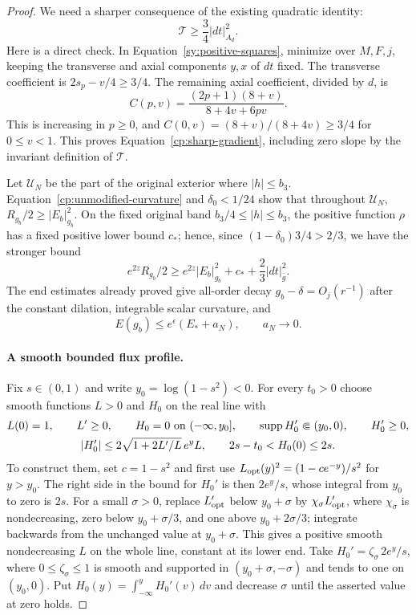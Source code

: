 \begin{proof}
We need a sharper consequence of the existing quadratic identity:
\begin{equation}\label{cp:sharp-gradient}
 \mathcal T\ge\frac34|dt|_{A_d}^2.
\end{equation}
Here is a direct check.  In Equation~\eqref{sy:positive-squares},
minimize over $M,F,j$, keeping the transverse and axial components
$y,x$ of $dt$ fixed.  The transverse coefficient is
$2s_p-v/4\ge3/4$.  The remaining axial coefficient, divided by $d$, is
\[
 C(p,v)=\frac{(2p+1)(8+v)}{8+4v+6pv}.
\]
This is increasing in $p\ge0$, and
$C(0,v)=(8+v)/(8+4v)\ge3/4$ for $0\le v<1$.
This proves Equation~\eqref{cp:sharp-gradient}, including zero slope
by the invariant definition of $\mathcal T$.

Let $\mathcal U_N$ be the part of the original exterior where
$|h|\le b_3$.  Equation~\eqref{cp:unmodified-curvature} and
$\delta_0<1/24$ show that throughout $\mathcal U_N$,
$R_{g_b}/2\ge|E_b|_{g_b}^2$.  On the fixed original band
$b_3/4\le|h|\le b_3$, the positive function $\rho$ has a fixed
positive lower bound $c_*$; hence, since
$(1-\delta_0)3/4>2/3$, we have the stronger bound
\begin{equation}\label{cp:retained-band}
 e^{2z}R_{g_b}/2\ge e^{2z}|E_b|_{g_b}^2+c_*
                       +\frac23|dt|_{\bar g}^2.
\end{equation}
The end estimates already proved give all-order decay
$g_b-\delta=O_j(r^{-1})$ after the constant dilation, integrable
scalar curvature, and
\[
 E(g_b)\le e^\epsilon(E_*+a_N),\qquad a_N\longrightarrow0.
\]

\paragraph{A smooth bounded flux profile.}
Fix $s\in(0,1)$ and write $y_0=\log(1-s^2)<0$.  For every
$t_0>0$ choose smooth functions $L>0$ and $H_0$ on the real line with
\begin{gather*}
 L(0)=1,\qquad L'\ge0,\qquad
 H_0=0\ \hbox{on }(-\infty,y_0],\qquad
 \operatorname{supp}H_0'\Subset(y_0,0),\qquad H_0'\ge0,\\
 |H_0'|\le2\sqrt{1+2L'/L}\,e^yL,
 \qquad 2s-t_0<H_0(0)\le2s.
\end{gather*}
To construct them, set $c=1-s^2$ and first use
$L_{\rm opt}(y)^2=(1-ce^{-y})/s^2$ for $y>y_0$.
The right side in the bound for $H_0'$ is then $2e^y/s$, whose
integral from $y_0$ to zero is $2s$.  For a small $\sigma>0$, replace
$L_{\rm opt}'$ below $y_0+\sigma$ by
$\chi_\sigma L_{\rm opt}'$, where $\chi_\sigma$ is nondecreasing,
zero below $y_0+\sigma/3$, and one above $y_0+2\sigma/3$; integrate
backwards from the unchanged value at $y_0+\sigma$.
This gives a positive smooth nondecreasing $L$ on the whole line,
constant at its lower end.  Take $H_0'=\zeta_\sigma\,2e^y/s$,
where $0\le\zeta_\sigma\le1$ is smooth and supported in
$(y_0+\sigma,-\sigma)$ and tends to one on $(y_0,0)$.
Put $H_0(y)=\int_{-\infty}^yH_0'(v)\,dv$ and decrease $\sigma$
until the asserted value at zero holds.


\end{proof}
